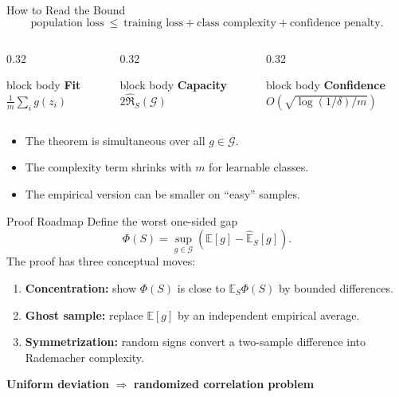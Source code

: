 \documentclass[aspectratio=169,10pt]{beamer}
\newcommand{\Gc}{\mathcal{G}}
\newcommand{\RadS}{\widehat{\mathfrak{R}}_S}
\newcommand{\E}{\mathbb{E}}
\newcommand{\KeyBox}[1]{%
  \begin{beamercolorbox}[rounded=true,sep=0.22cm,wd=\linewidth]{block body}
    #1
  \end{beamercolorbox}%
}
\begin{document}
\begin{frame}[t]{How to Read the Bound}
  \vspace{0.10cm}
  \[
    \text{population loss}
    \ \le\ \text{training loss}
    +\text{class complexity}
    +\text{confidence penalty}.
  \]
  \vspace{0.10cm}
  \begin{columns}[T,totalwidth=\textwidth]
    \begin{column}{0.32\textwidth}
      \KeyBox{\centering\textbf{Fit}\\$\frac1m\sum_i g(z_i)$}
    \end{column}
    \begin{column}{0.32\textwidth}
      \KeyBox{\centering\textbf{Capacity}\\$2\RadS(\Gc)$}
    \end{column}
    \begin{column}{0.32\textwidth}
      \KeyBox{\centering\textbf{Confidence}\\$O(\sqrt{\log(1/\delta)/m})$}
    \end{column}
  \end{columns}
  \vspace{0.18cm}
  \begin{itemize}
    \setlength{\itemsep}{0.09cm}
    \item The theorem is simultaneous over all $g\in\Gc$.
    \item The complexity term shrinks with $m$ for learnable classes.
    \item The empirical version can be smaller on ``easy'' samples.
  \end{itemize}
\end{frame}



\begin{frame}[t]{Proof Roadmap}
  \vspace{0.05cm}
  Define the worst one-sided gap
  \[
    \Phi(S)=\sup_{g\in\Gc}\left(\E[g]-\widehat{\E}_S[g]\right).
  \]
  The proof has three conceptual moves:
  \vspace{0.04cm}
  \begin{enumerate}
    \setlength{\itemsep}{0.15cm}
    \item \textbf{Concentration:} show $\Phi(S)$ is close to $\E_S\Phi(S)$ by bounded differences.
    \item \textbf{Ghost sample:} replace $\E[g]$ by an independent empirical average.
    \item \textbf{Symmetrization:} random signs convert a two-sample difference into Rademacher complexity.
  \end{enumerate}
  \vspace{0.10cm}
  \centering
  \textbf{Uniform deviation} $\Rightarrow$ \textbf{randomized correlation problem}
\end{frame}
\end{document}
